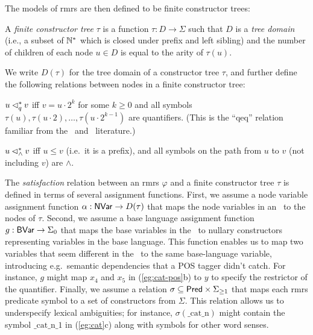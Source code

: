 The models of {\sc rmrs} are then defined to be finite constructor
trees:
\begin{definition}\label{defn:models}
  A {\em finite constructor tree} $\tau$ is a function $\tau:D
  \rightarrow \Sigma$ such that $D$ is a \emph{tree domain} (i.e., a
  subset of $\mathbb{N}^*$ which is closed under prefix and left sibling) and
  the number of children of each node $u \in D$ is equal to the arity
  of $\tau(u)$.  
\end{definition}


We write $D(\tau)$ for the tree domain of a constructor tree $\tau$,
and further define the following relations between nodes in a finite
constructor tree:

\begin{definition}\label{defn:dominance}
$u \lhd^*_q v$ iff $v = u \cdot 2^k$ for some $k \geq 0$ and all
  symbols $\tau(u), \tau(u \cdot 2), \ldots, \tau(u \cdot 2^{k-1})$
  are quantifiers.  (This is the ``qeq'' relation familiar from the
  \mrs\ and \rmrs\ literature.)

  $u \lhd^*_\wedge v$ iff $u \leq v$ (i.e.\ it is a prefix), and all
  symbols on the path from $u$ to $v$ (not including $v$) are
  $\wedge$.
\end{definition}

The {\em satisfaction} relation between an {\sc rmrs} $\varphi$ and a
finite constructor tree $\tau$ is defined in terms of several
assignment functions.  First, we assume a node variable assignment
function $\alpha: \mathsf{NVar} \rightarrow D(\tau)$ that maps the node
variables in an \rmrs\ to the nodes of $\tau$.  Second, we assume a
base language assignment function $g:\mathsf{BVar} \rightarrow \Sigma_0$ that
maps the base variables in the \rmrs\ to nullary constructors
representing variables in the base language.  This function enables us
to map two variables that seem different in the \rmrs\ to the same
base-language variable, introducing e.g.\ semantic dependencies that a
POS tagger didn't catch.  For instance, $g$ might map $x_4$ and $x_5$
in (\ref{eg:cat-pos}b) to $y$ to specify the restrictor of the
quantifier.  Finally, we assume a relation $\sigma \subseteq \mathsf{Pred}
\times \Sigma_{\geq 1}$ that maps each {\sc rmrs} predicate symbol to
a set of constructors from $\Sigma$.  This relation allows us to
underspecify lexical ambiguities; for instance,
$\sigma(\mathrm{\_cat\_n})$ might contain the symbol $\mathrm{\_cat\_n\_1}$
in (\ref{eg:cat}c) along with symbols for other word senses.


